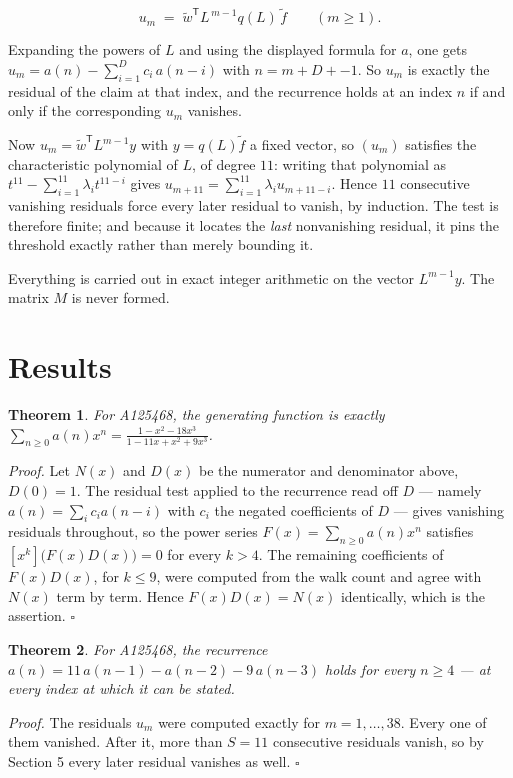 \documentclass[11pt]{article}
\newtheorem{theorem}{Theorem}
\theoremstyle{definition}
\begin{document}
\[u_m \;=\; \tilde w^{\mathsf T} L^{\,m-1} q(L)\,\tilde f \qquad (m \ge 1).\]

Expanding the powers of $L$ and using the displayed formula for $a$, one gets $u_m = a(n) - \sum_{i=1}^{D} c_i\,a(n-i)$ with $n = m + D + -1$. So $u_m$ is exactly the residual of the claim at that index, and the recurrence holds at an index $n$ if and only if the corresponding $u_m$ vanishes.

Now $u_m = \tilde w^{\mathsf T} L^{m-1} y$ with $y = q(L)\tilde f$ a fixed vector, so $(u_m)$ satisfies the characteristic polynomial of $L$, of degree $11$: writing that polynomial as $t^{11} - \sum_{i=1}^{11} \lambda_i t^{11-i}$ gives $u_{m+11} = \sum_{i=1}^{11} \lambda_i u_{m+11-i}$. Hence $11$ consecutive vanishing residuals force every later residual to vanish, by induction. The test is therefore finite; and because it locates the {\itshape last} nonvanishing residual, it pins the threshold exactly rather than merely bounding it.

Everything is carried out in exact integer arithmetic on the vector $L^{m-1}y$. The matrix $M$ is never formed.

\section{Results}

\begin{theorem} For A125468, the generating function is exactly $\sum_{n\ge 0} a(n)x^n = \frac{1 - x^{2} - 18x^{3}}{1 - 11x + x^{2} + 9x^{3}}$.\end{theorem}

{\itshape Proof.} Let $N(x)$ and $D(x)$ be the numerator and denominator above, $D(0)=1$. The residual test applied to the recurrence read off $D$ --- namely $a(n) = \sum_i c_i a(n-i)$ with $c_i$ the negated coefficients of $D$ --- gives vanishing residuals throughout, so the power series $F(x)=\sum_{n\ge 0}a(n)x^n$ satisfies $[x^k]\bigl(F(x)D(x)\bigr) = 0$ for every $k > 4$. The remaining coefficients of $F(x)D(x)$, for $k \le 9$, were computed from the walk count and agree with $N(x)$ term by term. Hence $F(x)D(x) = N(x)$ identically, which is the assertion. $\square$

\begin{theorem} For A125468, the recurrence $a(n) = 11\,a(n-1) - a(n-2) - 9\,a(n-3)$ holds for every $n \ge 4$ --- at every index at which it can be stated.\end{theorem}

{\itshape Proof.} The residuals $u_m$ were computed exactly for $m = 1,\dots,38$. Every one of them vanished. After it, more than $S = 11$ consecutive residuals vanish, so by Section 5 every later residual vanishes as well. $\square$
\end{document}
